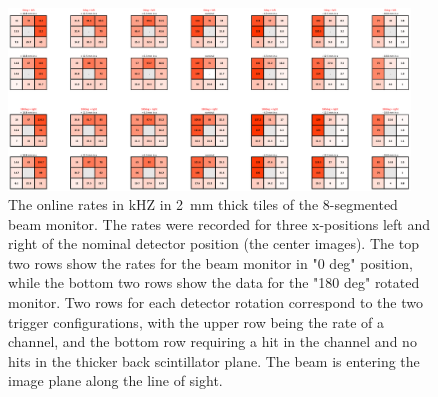 \begin{refsection}
        \begin{figure}
            \centering
            \includegraphics[width=0.95\textwidth]{Figures/muEDM_Dec2023/BeamMonRect_scanData2023.png}%
            \caption[muEDM 2023: Beam monitor 8-segments analysis]{The online rates in kHZ in 2~mm thick tiles of the 8-segmented beam monitor. The rates were recorded for three x-positions left and right of the nominal detector position (the center images). The top two rows show the rates for the beam monitor in "0 deg" position, while the bottom two rows show the data for the "180 deg" rotated monitor. Two rows for each detector rotation correspond to the two trigger configurations, with the upper row being the rate of a channel, and the bottom row requiring a hit in the channel and no hits in the thicker back scintillator plane. The beam is entering the image plane along the line of sight.}
            \label{fig:BeamMonRect_positionScan}
        \end{figure}
        

\end{refsection}
